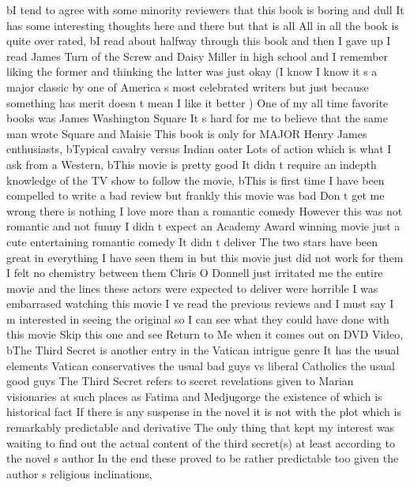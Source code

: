 \documentclass[
]{article}
\newenvironment{Shaded}{}{}
\newcommand{\NormalTok}[1]{#1}
\newcommand{\StringTok}[1]{\textcolor[rgb]{0.25,0.44,0.63}{#1}}
\begin{document}
\begin{Shaded}
\begin{Highlighting}[]
\NormalTok{       b}\StringTok{\textquotesingle{}I tend to agree with some minority reviewers that this book is boring and dull It has some interesting thoughts here and there but that is all All in all the book is quite over rated\textquotesingle{}}\NormalTok{,}
\NormalTok{       b}\StringTok{\textquotesingle{}I read about halfway through this book and then I gave up I read James Turn of the Screw and Daisy Miller in high school and I remember liking the former and thinking the latter was just okay (I know I know it s a major classic by one of America s most celebrated writers but just because something has merit doesn t mean I like it better ) One of my all time favorite books was James Washington Square It s hard for me to believe that the same man wrote Square and Maisie This book is only for MAJOR Henry James enthusiasts\textquotesingle{}}\NormalTok{,}
\NormalTok{       b}\StringTok{\textquotesingle{}Typical cavalry versus Indian oater Lots of action which is what I ask from a Western\textquotesingle{}}\NormalTok{,}
\NormalTok{       b}\StringTok{\textquotesingle{}This movie is pretty good It didn t require an indepth knowledge of the TV show to follow the movie\textquotesingle{}}\NormalTok{,}
\NormalTok{       b}\StringTok{\textquotesingle{}This is first time I have been compelled to write a bad review but frankly this movie was bad Don t get me wrong there is nothing I love more than a romantic comedy However this was not romantic and not funny I didn t expect an Academy Award winning movie just a cute entertaining romantic comedy It didn t deliver The two stars have been great in everything I have seen them in but this movie just did not work for them I felt no chemistry between them Chris O Donnell just irritated me the entire movie and the lines these actors were expected to deliver were horrible I was embarrased watching this movie I ve read the previous reviews and I must say I m interested in seeing the original so I can see what they could have done with this movie Skip this one and see Return to Me when it comes out on DVD Video\textquotesingle{}}\NormalTok{,}
\NormalTok{       b}\StringTok{\textquotesingle{}The Third Secret is another entry in the Vatican intrigue genre It has the usual elements Vatican conservatives the usual bad guys vs liberal Catholics the usual good guys The Third Secret refers to secret revelations given to Marian visionaries at such places as Fatima and Medjugorge the existence of which is historical fact If there is any suspense in the novel it is not with the plot which is remarkably predictable and derivative The only thing that kept my interest was waiting to find out the actual content of the third secret(s) at least according to the novel s author In the end these proved to be rather predictable too given the author s religious inclinations\textquotesingle{}}\NormalTok{,}

\end{Highlighting}
\end{Shaded}
\end{document}
